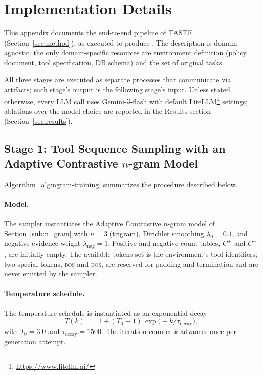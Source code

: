 \section{Implementation Details}
\label{app:method_implementation}

This appendix documents the end-to-end pipeline of TASTE (Section~\ref{sec:method}), as executed to produce \ourbenchmark. The description is domain-agnostic: the only domain-specific resources are environment definition (policy document, tool specification, DB schema) and the set of original tasks.

All three stages are executed as separate processes that communicate via artifacts; each stage's output is the following stage's input. Unless stated otherwise, every LLM call uses Gemini-$3$-flash with default LiteLLM\footnote{\url{https://www.litellm.ai/}} settings; ablations over the model choice are reported in the Results section (Section~\ref{sec:results}).

\subsection{Stage 1: Tool Sequence Sampling with an Adaptive Contrastive $n$-gram Model}
\label{app:n-gram}

Algorithm~\ref{alg:ngram-training} summarizes the procedure described below.

\paragraph{Model.}
The sampler instantiates the Adaptive Contrastive $n$-gram model of Section~\ref{sub:n_gram} with $n{=}3$ (trigram), Dirichlet smoothing $\lambda_0 = 0.1$, and negative-evidence weight $\lambda_{\text{neg}} = 1$. Positive and negative count tables, $C^+$ and $C^-$, are initially empty. The available tokens set is the environment's tool identifiers; two special tokens, \textsc{bos} and \textsc{eos}, are reserved for padding and termination and are never emitted by the sampler.

\paragraph{Temperature schedule.}
The temperature schedule is instantiated as an exponential decay
\[
  T(k) \;=\; 1 + (T_0 - 1)\,\exp\!\bigl(-k / \tau_{\text{decay}}\bigr),
\]
with $T_0 = 3.0$ and $\tau_{\text{decay}} = 1500$. The iteration counter $k$ advances once per generation attempt.

